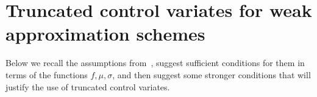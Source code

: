 \documentclass[11pt,a4paper]{amsart}
\theoremstyle{plain}
\newtheorem{proposition}[theorem]{Proposition}
\theoremstyle{definition}
\theoremstyle{remark}
\numberwithin{equation}{section}
\newcommand*{\EE}{\mathbb E}
\newcommand*{\cA}{\mathcal A}
\begin{document}
%
%
%

\section{Truncated control variates for weak approximation schemes}
\label{sec:trunc}
Below we recall the assumptions from~\cite{belomestny2016variance},
suggest sufficient conditions for them in terms of the functions
$f,\mu,\sigma$,
and then suggest some stronger conditions
that will justify the use of truncated control variates.
\end{document}
